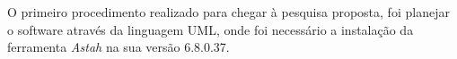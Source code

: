 	
	\par O primeiro procedimento realizado para chegar à pesquisa proposta, foi
planejar o software através da linguagem UML, onde foi necessário a instalação
da ferramenta \textit{Astah} na sua versão 6.8.0.37.